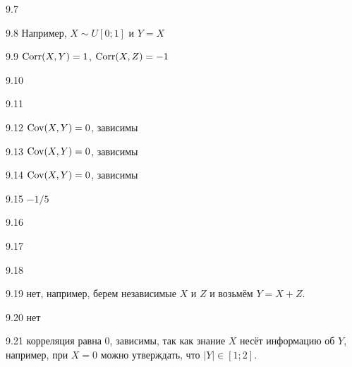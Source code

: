 \protect \hypertarget {soln:9.7}{}
\begin{solution}{{9.7}}
\end{solution}
\protect \hypertarget {soln:9.8}{}
\begin{solution}{{9.8}}
  Например, $X\sim U[0;1]$ и $Y=X$
\end{solution}
\protect \hypertarget {soln:9.9}{}
\begin{solution}{{9.9}}
$\operatorname{Corr}(X,Y)=1$, $\operatorname{Corr}(X,Z)=-1$
\end{solution}
\protect \hypertarget {soln:9.10}{}
\begin{solution}{{9.10}}
\end{solution}
\protect \hypertarget {soln:9.11}{}
\begin{solution}{{9.11}}
\end{solution}
\protect \hypertarget {soln:9.12}{}
\begin{solution}{{9.12}}
      $\operatorname{Cov}(X,Y)=0$, зависимы
\end{solution}
\protect \hypertarget {soln:9.13}{}
\begin{solution}{{9.13}}
    $\operatorname{Cov}(X,Y)=0$, зависимы
\end{solution}
\protect \hypertarget {soln:9.14}{}
\begin{solution}{{9.14}}
  $\operatorname{Cov}(X,Y)=0$, зависимы
\end{solution}
\protect \hypertarget {soln:9.15}{}
\begin{solution}{{9.15}}
  $-1/5$
\end{solution}
\protect \hypertarget {soln:9.16}{}
\begin{solution}{{9.16}}
\end{solution}
\protect \hypertarget {soln:9.17}{}
\begin{solution}{{9.17}}
\end{solution}
\protect \hypertarget {soln:9.18}{}
\begin{solution}{{9.18}}
\end{solution}
\protect \hypertarget {soln:9.19}{}
\begin{solution}{{9.19}}
  нет, например, берем независимые $X$ и $Z$ и возьмём $Y=X+Z$.
\end{solution}
\protect \hypertarget {soln:9.20}{}
\begin{solution}{{9.20}}
нет
\end{solution}
\protect \hypertarget {soln:9.21}{}
\begin{solution}{{9.21}}
  корреляция равна $0$, зависимы, так как знание $X$ несёт информацию об $Y$, например, при $X=0$ можно утверждать, что $|Y| \in [1;2]$.
\end{solution}
